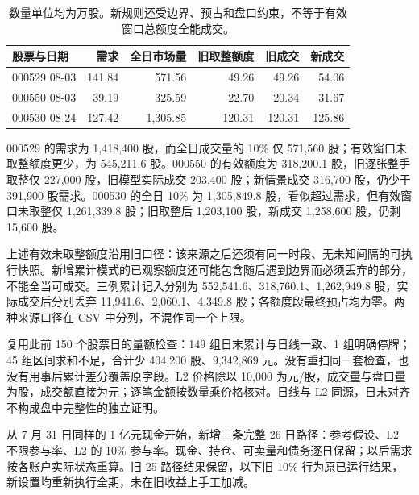 
\begin{table}[H]\centering\small\begin{tabular}{lrrrrr}

\toprule 股票与日期 &需求&全日市场量&旧取整额度&旧成交&新成交\\\midrule

000529 08-03 &141.84&571.56&49.26&49.26&54.06\\

000550 08-03 &39.19&325.59&22.70&20.34&31.67\\

000530 08-24 &127.42&1,305.85&120.31&120.31&125.86\\

\bottomrule\end{tabular}

\caption{数量单位均为万股。新规则还受边界、预占和盘口约束，不等于有效窗口总额度全能成交。}\end{table}

000529 的需求为 1,418,400 股，而全日成交量的 10\% 仅 571,560 股；有效窗口未取整额度更少，为 545,211.6 股。000550 的有效额度为 318,200.1 股，旧逐张整手取整仅 227,000 股，旧模型实际成交 203,400 股；新情景成交 316,700 股，仍少于 391,900 股需求。000530 的全日 10\% 为 1,305,849.8 股，看似超过需求，但有效窗口未取整仅 1,261,339.8 股；旧取整后 1,203,100 股，新成交 1,258,600 股，仍剩 15,600 股。

上述有效未取整额度沿用旧口径：该来源之后还须有同一时段、无未知间隔的可执行快照。新增累计模式的已观察额度还可能包含随后遇到边界而必须丢弃的部分，不能全当可成交。三例累计记入分别为 552,541.6、318,760.1、1,262,949.8 股，实际成交后分别丢弃 11,941.6、2,060.1、4,349.8 股；各额度段最终预占均为零。两种来源口径在 CSV 中分列，不混作同一个上限。

复用此前 150 个股票日的量额检查：149 组日末累计与日线一致、1 组明确停牌；45 组区间求和不足，合计少 404,200 股、9,342,869 元。没有重扫同一套检查，也没有用事后累计差分覆盖原字段。L2 价格除以 10,000 为元/股，成交量与盘口量为股，成交额直接为元；逐笔金额按数量乘价格核对。日线与 L2 同源，日末对齐不构成盘中完整性的独立证明。

\clearpage


从 7 月 31 日同样的 1 亿元现金开始，新增三条完整 26 日路径：参考假设、L2 不限参与率、L2 的 10\% 参与率。现金、持仓、可卖量和债务逐日保留；以后需求按各账户实际状态重算。旧 25 路径结果保留，以下旧 10\% 行为原已运行结果，新设置均重新执行全期，未在旧收益上手工加减。


